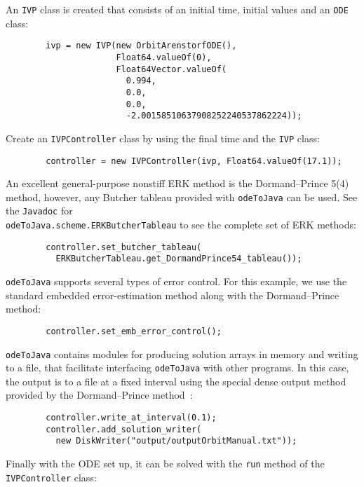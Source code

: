 \documentclass[10pt,letterpaper]{article}
\newcommand\Javadoc{{\tt Javadoc}}
\newcommand\odj{{\tt odeToJava}}
\newcommand\ode{{\tt ODE}}
\newcommand\ivp{{\tt IVP}}
\newcommand\ivpcont{{\tt IVPController}}
\begin{document}
An \ivp{} class is created that consists of an initial time, initial
values and an \ode{} class:

\begin{lstlisting}
        ivp = new IVP(new OrbitArenstorfODE(),
                      Float64.valueOf(0),
                      Float64Vector.valueOf(
                        0.994,
                        0.0,
                        0.0,
                        -2.00158510637908252240537862224));
\end{lstlisting}

Create an \ivpcont{} class by using the final time and the \ivp{} class:

\begin{lstlisting}
        controller = new IVPController(ivp, Float64.valueOf(17.1));
\end{lstlisting}

An excellent general-purpose nonstiff ERK method is the Dormand--Prince 5(4)
method, however, any Butcher tableau provided with \odj{} can be used. See the
\Javadoc{} for \\ {\tt odeToJava.scheme.ERKButcherTableau} to see the
complete set of ERK methods:

\begin{lstlisting}
        controller.set_butcher_tableau(
          ERKButcherTableau.get_DormandPrince54_tableau());
\end{lstlisting}

\odj{} supports several types of error control. For this example, we use the
standard embedded error-estimation method along with the Dormand--Prince method:

\begin{lstlisting}
        controller.set_emb_error_control();
\end{lstlisting}

\odj{} contains modules for producing solution arrays in memory and writing to a
file, that facilitate interfacing \odj{} with other programs. In this case, the
output is to a file at a fixed interval using the special dense output method
provided by the Dormand--Prince method~\cite{HairerNorsettWanner1993}:

\begin{lstlisting}
        controller.write_at_interval(0.1);
        controller.add_solution_writer(
          new DiskWriter("output/outputOrbitManual.txt"));
\end{lstlisting}

Finally with the ODE set up, it can be solved with the {\tt run} method of the
{\tt IVPController} class:
\end{document}
